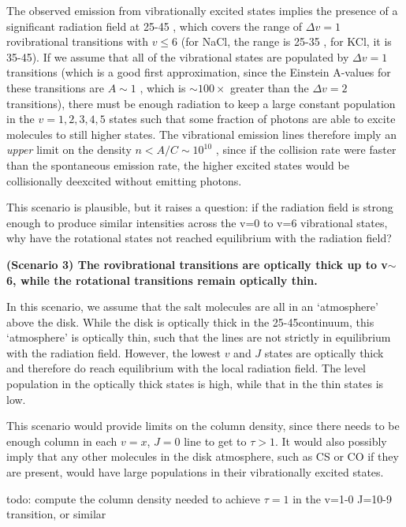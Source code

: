 \documentclass[twocolumn]{aastex62}
\begin{document}
The observed emission from vibrationally excited states implies the presence of
a significant radiation field at 25-45 \um, which covers the range of
$\Delta v=1$ rovibrational transitions with $v\leq6$ (for NaCl, the range is
25-35 \um, for KCl, it is 35-45\um).  If we assume that all of the vibrational
states are populated by $\Delta v=1$ transitions (which is a good first
approximation, since the Einstein A-values for these transitions are $A\sim1$
\pers, which is $\sim100\times$ greater than the $\Delta v=2$ transitions),
there must be enough radiation to keep a large constant population in the $v=1,
2, 3, 4, 5$ states such that some fraction of photons are able to excite
molecules to still higher states.   The vibrational emission lines therefore
imply an \emph{upper} limit on the density $n<A/C\sim10^{10}$ \percc, since if
the collision rate were faster than the spontaneous emission rate, the higher
excited states would be collisionally deexcited without emitting photons.


This scenario is plausible, but it raises a question: if the radiation field is
strong enough to produce similar intensities across the v=0 to v=6 vibrational
states, why have the rotational states not reached equilibrium with the radiation
field?

\textbf{(Scenario 3) The rovibrational transitions are optically thick up to
v$\sim$6, while the rotational transitions remain optically thin.}

In this scenario, we assume that the salt molecules are all in an `atmosphere'
above the disk.  While the disk is optically thick in the 25-45\um continuum,
this `atmosphere' is optically thin, such that the lines are not strictly in
equilibrium with the radiation field.  However, the lowest $v$ and $J$ states are
optically thick and therefore do reach equilibrium with the local radiation
field.  The level population in the optically thick states is high, while that in the
thin states is low.  

This scenario would provide limits on the column density, since there
needs to be enough column in each $v=x$, $J=0$ line to get to $\tau>1$. 
It would also possibly imply that any other molecules in the disk atmosphere,
such as CS or CO if they are present, would have large populations in their
vibrationally excited states.

{\color{red} todo: compute the column density needed to achieve $\tau=1$ in the
v=1-0 J=10-9 transition, or similar}
\end{document}
